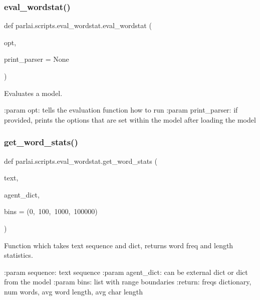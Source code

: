 \subsubsection{\texorpdfstring{eval\+\_\+wordstat()}{eval\_wordstat()}}
{\footnotesize\ttfamily def parlai.\+scripts.\+eval\+\_\+wordstat.\+eval\+\_\+wordstat (\begin{DoxyParamCaption}\item[{}]{opt,  }\item[{}]{print\+\_\+parser = {\ttfamily None} }\end{DoxyParamCaption})}

\begin{DoxyVerb}Evaluates a model.

:param opt: tells the evaluation function how to run
:param print_parser: if provided, prints the options that are set within the
    model after loading the model
\end{DoxyVerb}
 \mbox{\label{namespaceparlai_1_1scripts_1_1eval__wordstat_ab2d96b5ac07c988934a0320739fc3c60}} 
\subsubsection{\texorpdfstring{get\+\_\+word\+\_\+stats()}{get\_word\_stats()}}
{\footnotesize\ttfamily def parlai.\+scripts.\+eval\+\_\+wordstat.\+get\+\_\+word\+\_\+stats (\begin{DoxyParamCaption}\item[{}]{text,  }\item[{}]{agent\+\_\+dict,  }\item[{}]{bins = {\ttfamily (0,~100,~1000,~100000)} }\end{DoxyParamCaption})}

\begin{DoxyVerb}Function which takes text sequence and dict, returns word freq and length
statistics.

:param sequence: text sequence
:param agent_dict: can be external dict or dict from the model
:param bins: list with range boundaries
:return: freqs dictionary, num words, avg word length, avg char length
\end{DoxyVerb}
 \mbox{\label{namespaceparlai_1_1scripts_1_1eval__wordstat_af41cd95533433b93e7383bc6dab04963}} 
